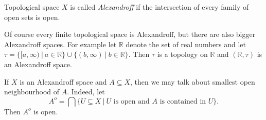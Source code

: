 \documentclass[12pt]{article}
\begin{document}
Topological space $X$ is called \textit{Alexandroff} if the intersection of every family of open sets is open.

Of course every finite topological space is Alexandroff, but there are also bigger Alexandroff spaces. For example let $\mathbb{R}$ denote the set of real numbers and let $\tau=\{[a,\infty)\ |\ a\in\mathbb{R}\} \cup \{(b,\infty)\ |\ b\in\mathbb{R}\}$. Then $\tau$ is a topology on $\mathbb{R}$ and $(\mathbb{R},\tau)$ is an Alexandroff space.

If $X$ is an Alexandroff space and $A\subseteq X$, then we may talk about smallest open neighbourhood of $A$. Indeed, let $$A^{o}=\bigcap \{U\subseteq X\ |\ U\mbox{ is open and }A\mbox{ is contained in }U\}.$$
Then $A^{o}$ is open.
\end{document}

